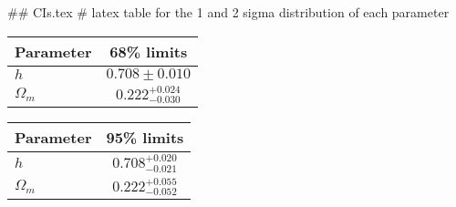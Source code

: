 ## CIs.tex
# latex table for the 1 and 2 sigma distribution of each parameter

\begin{tabular} { l  c}
 Parameter &  68\% limits\\
\hline
{\boldmath$h              $} & $0.708\pm 0.010            $\\
{\boldmath$\Omega_m       $} & $0.222^{+0.024}_{-0.030}   $\\
\hline
\end{tabular}

\begin{tabular} { l  c}
 Parameter &  95\% limits\\
\hline
{\boldmath$h              $} & $0.708^{+0.020}_{-0.021}   $\\
{\boldmath$\Omega_m       $} & $0.222^{+0.055}_{-0.052}   $\\
\hline
\end{tabular}
